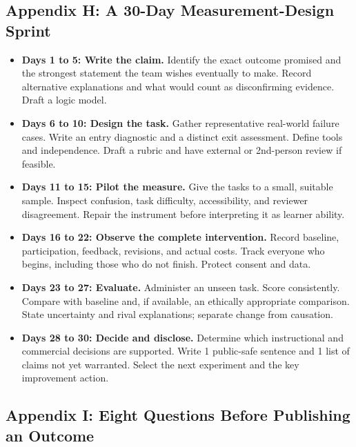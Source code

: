 \subsection*{Appendix H: A 30-Day Measurement-Design Sprint}

\begin{itemize}[leftmargin=1.5em, itemsep=0.6em]
    \item \textbf{Days 1 to 5: Write the claim.} Identify the exact outcome promised and the strongest statement the team wishes eventually to make. Record alternative explanations and what would count as disconfirming evidence. Draft a logic model.
    \item \textbf{Days 6 to 10: Design the task.} Gather representative real-world failure cases. Write an entry diagnostic and a distinct exit assessment. Define tools and independence. Draft a rubric and have external or 2nd-person review if feasible.
    \item \textbf{Days 11 to 15: Pilot the measure.} Give the tasks to a small, suitable sample. Inspect confusion, task difficulty, accessibility, and reviewer disagreement. Repair the instrument before interpreting it as learner ability.
    \item \textbf{Days 16 to 22: Observe the complete intervention.} Record baseline, participation, feedback, revisions, and actual costs. Track everyone who begins, including those who do not finish. Protect consent and data.
    \item \textbf{Days 23 to 27: Evaluate.} Administer an unseen task. Score consistently. Compare with baseline and, if available, an ethically appropriate comparison. State uncertainty and rival explanations; separate change from causation.
    \item \textbf{Days 28 to 30: Decide and disclose.} Determine which instructional and commercial decisions are supported. Write 1 public-safe sentence and 1 list of claims not yet warranted. Select the next experiment and the key improvement action.
\end{itemize}

\subsection*{Appendix I: Eight Questions Before Publishing an Outcome}

